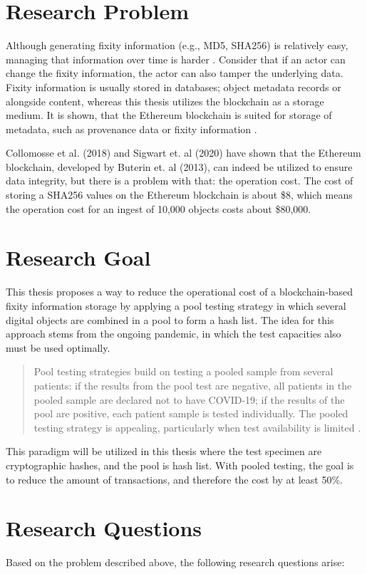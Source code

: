 \section{Research Problem}
Although generating fixity information (e.g., MD5, SHA256) is relatively easy, managing that information over time is harder \cite[35]{kirschenbaum2010digital}. Consider that if an actor can change the fixity information, the actor can also tamper the underlying data. Fixity information is usually stored in databases; object metadata records or alongside content, whereas this thesis utilizes the blockchain as a storage medium.
It is shown, that the Ethereum blockchain is suited for storage of metadata, such as provenance data or fixity information \cite[1]{collomosse2018archangel}.

Collomosse et al. (2018) and Sigwart et. al (2020) have shown that the Ethereum blockchain, developed by Buterin et. al (2013), can indeed be utilized to ensure data integrity, but there is a problem with that: the operation cost. The cost of storing a SHA256 values on the Ethereum blockchain is about \$8, which means the operation cost for an ingest of 10,000 objects costs about \$80,000.

\section{Research Goal}
This thesis proposes a way to reduce the operational cost of a blockchain-based fixity information storage by applying a pool testing strategy in which several digital objects are combined in a pool to form a hash list. The idea for this approach stems from the ongoing pandemic, in which the test capacities also must be used optimally.
\begin{quote}
Pool testing strategies build on testing a pooled sample from several patients: if the results from the pool test are negative, all patients in the pooled sample are declared not to have COVID-19; if the results of the pool are positive, each patient sample is tested individually. The pooled testing strategy is appealing, particularly when test availability is limited \cite[1]{cherif2020simulation}.
\end{quote}
This paradigm will be utilized in this thesis where the test specimen are cryptographic hashes, and the pool is hash list. With pooled testing, the goal is to reduce the amount of transactions, and therefore the cost by at least 50\%.

\section{Research Questions}
Based on the problem described above, the following research questions arise:

